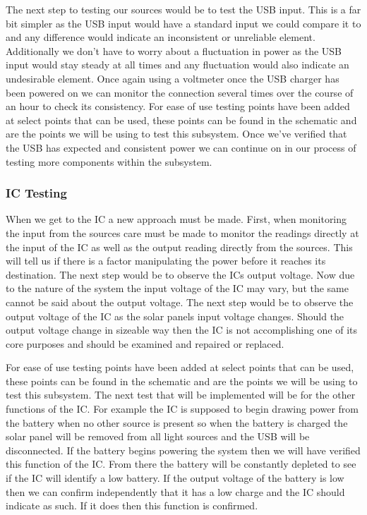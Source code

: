 The next step to testing our sources would be to test the USB input. This is a far bit simpler as the USB input would have a standard input we could compare it to and any difference would indicate an inconsistent or unreliable element. Additionally we don't have to worry about a fluctuation in power as the USB input would stay steady at all times and any fluctuation would also indicate an undesirable element. Once again using a voltmeter once the USB charger has been powered on we can monitor the connection several times over the course of an hour to check its consistency. For ease of use testing points have been added at select points that can be used, these points can be found in the schematic and are the points we will be using to test this subsystem. Once we've verified that the USB has expected and consistent power we can continue on in our process of testing more components within the subsystem.

\subsubsection{IC Testing}
When we get to the IC a new approach must be made. First, when monitoring the input from the sources care must be made to monitor the readings directly at the input of the IC as well as the output reading directly from the sources. This will tell us if there is a factor manipulating the power before it reaches its destination. The next step would be to observe the ICs output voltage. Now due to the nature of the system the input voltage of the IC may vary, but the same cannot be said about the output voltage. The next step would be to observe the output voltage of the IC as the solar panels input voltage changes. Should the output voltage change in sizeable way then the IC is not accomplishing one of its core purposes and should be examined and repaired or replaced. 

For ease of use testing points have been added at select points that can be used, these points can be found in the schematic and are the points we will be using to test this subsystem. The next test that will be implemented will be for the other functions of the IC. For example the IC is supposed to begin drawing power from the battery when no other source is present so when the battery is charged the solar panel will be removed from all light sources and the USB will be disconnected. If the battery begins powering the system then we will have verified this function of the IC. From there the battery will be constantly depleted to see if the IC will identify a low battery. If the output voltage of the battery is low then we can confirm independently that it has a low charge and the IC should indicate as such. If it does then this function is confirmed.

